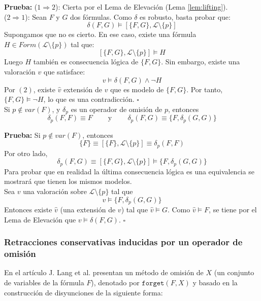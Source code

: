 \noindent \textbf{Prueba:} ($1 \Rightarrow 2$): Cierta por el Lema de Elevación (Lema \ref{lem:lifting}).\\
($2 \Rightarrow 1$): Sean $F$ y $G$ dos fórmulas. Como $\delta$ es robusto, basta probar que:
$$\delta (F,G) \vDash [\{ F,G \}, \mathcal{L} \setminus \{ p \}]$$
Supongamos que no es cierto. En ese caso, existe una fórmula $H \in Form(\mathcal{L} \setminus \{ p \})$ tal que: 
$$[\{ F,G \}, \mathcal{L} \setminus \{ p \}] \vDash H$$ 
Luego $H$ también es consecuencia lógica de $\{ F,G \}$. Sin embargo, existe una valoración $v$ que satisface: 
$$v \vDash \delta (F,G) \wedge \neg H$$ 
Por $(2)$, existe $\hat{v}$ extensión de $v$ que es modelo de $\{ F,G \}$. Por tanto, $\{ F,G \} \vDash \neg H$, lo que es una contradicción. \hspace{10.5cm} $\square$ \\

\cor Si $p \notin var(F)$, y $\delta_p$ es un operador de omisión de $p$, entonces
$$\delta_p(F,F) \equiv F \;\;\;\;\;\;\;\; \text{y} \;\;\;\;\;\;\;\; \delta_p (F,G) \equiv \{ F,\delta_p (G,G) \}$$

\noindent \label{cor:pnotinvar} \textbf{Prueba:} Si $p \notin var(F)$, entonces 
$$\{ F \} \equiv [\{ F \} ,\mathcal{L} \setminus \{ p \}] \equiv \delta_p (F,F)$$
Por otro lado, 
$$\delta_p (F,G) \equiv [\{ F,G \} , \mathcal{L} \setminus \{ p \}] \vDash \{ F,\delta_p (G,G) \}$$ Para probar que en realidad la última consecuencia lógica es una equivalencia se mostrará que tienen los mismos modelos.\\
Sea $v$ una valoración sobre $\mathcal{L} \setminus \{ p \}$ tal que $$v \vDash \{ F,\delta_p (G,G) \}$$ Entonces existe $\hat{v}$ (una extensión de $v$) tal que $\hat{v} \vDash G$. Como $\hat{v} \vDash F$, se tiene por el Lema de Elevación que $v \vDash \delta (F,G)$. \hspace{10cm} $\square$ 

\newpage 
 
\subsubsection{Retracciones conservativas inducidas por un operador de omisión} 
 
En el artículo \cite{Lang2003} J. Lang et al.  presentan un método de omisión de $X$ (un conjunto de variables de la fórmula $F$), denotado por $\texttt{forget}(F,X)$ y basado en la construcción de disyunciones de la siguiente forma:\\

